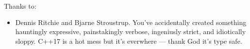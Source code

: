 \noindent
Thanks to:
\begin{itemize}
    \item Dennis Ritchie and Bjarne Stroustrup.  You've accidentally created something hauntingly expressive, painstakingly verbose, ingeniusly strict, and idiotically sloppy.  C++17 is a hot mess but it's everwhere --- thank God it's type safe.  
\end{itemize}
